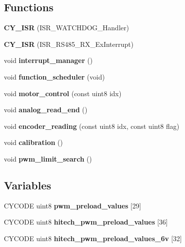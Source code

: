 \subsection*{Functions}
\begin{DoxyCompactItemize}
\item 
\mbox{\label{interruptions_8c_aba74df0c62c62434ebccf8124c5d5fef}} 
{\bfseries C\+Y\+\_\+\+I\+SR} (I\+S\+R\+\_\+\+W\+A\+T\+C\+H\+D\+O\+G\+\_\+\+Handler)
\item 
\mbox{\label{interruptions_8c_a7692d8c3185943c5bdfaa6de0a172ad3}} 
{\bfseries C\+Y\+\_\+\+I\+SR} (I\+S\+R\+\_\+\+R\+S485\+\_\+\+R\+X\+\_\+\+Ex\+Interrupt)
\item 
\mbox{\label{interruptions_8c_a9790811526002d99b25a814afd02cbae}} 
void {\bfseries interrupt\+\_\+manager} ()
\item 
\mbox{\label{interruptions_8c_a39df971c4e9f194be50c54dfd7aeabfe}} 
void {\bfseries function\+\_\+scheduler} (void)
\item 
\mbox{\label{interruptions_8c_a717216ab689fc8b8ea3fb8795a816a2b}} 
void {\bfseries motor\+\_\+control} (const uint8 idx)
\item 
\mbox{\label{interruptions_8c_a00a8d34962a63161405e5d7785b9625e}} 
void {\bfseries analog\+\_\+read\+\_\+end} ()
\item 
\mbox{\label{interruptions_8c_ac8679c9d627ace495295abdacbc7dcf2}} 
void {\bfseries encoder\+\_\+reading} (const uint8 idx, const uint8 flag)
\item 
\mbox{\label{interruptions_8c_a6d9dc88d64cd1f74a30fd0e404a3bb31}} 
void {\bfseries calibration} ()
\item 
\mbox{\label{interruptions_8c_ab7b287cf5df2ea548297b951be2f20d4}} 
void {\bfseries pwm\+\_\+limit\+\_\+search} ()
\end{DoxyCompactItemize}
\subsection*{Variables}
\begin{DoxyCompactItemize}
\item 
C\+Y\+C\+O\+DE uint8 {\bfseries pwm\+\_\+preload\+\_\+values} [29]
\item 
\mbox{\label{interruptions_8c_a4234b71c84e0fb74d3ad698276b90f6e}} 
C\+Y\+C\+O\+DE uint8 {\bfseries hitech\+\_\+pwm\+\_\+preload\+\_\+values} [36]
\item 
\mbox{\label{interruptions_8c_a6dc1a7b985a28e3db77fad72bfbc0b46}} 
C\+Y\+C\+O\+DE uint8 {\bfseries hitech\+\_\+pwm\+\_\+preload\+\_\+values\+\_\+6v} [32]
\end{DoxyCompactItemize}


